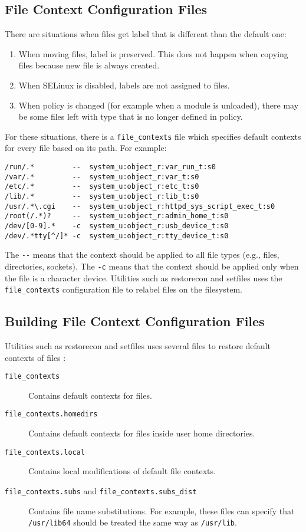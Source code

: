 \subsection{File Context Configuration Files}
There are situations when files get label that is different than the default
one:
\begin{enumerate}
    \item When moving files, label is preserved. This does not happen when
        copying files because new file is always created.
    \item When SELinux is disabled, labels are not assigned to files.
    \item When policy is changed (for example when a module is unloaded), there
        may be some files left with type that is no longer defined in policy.
\end{enumerate}
For these situations, there is a \texttt{file\_contexts} file which specifies
default contexts for every file based on its path. For example:
\begin{lstlisting}
/run/.*         --  system_u:object_r:var_run_t:s0
/var/.*	        --  system_u:object_r:var_t:s0
/etc/.*	        --  system_u:object_r:etc_t:s0
/lib/.*	        --  system_u:object_r:lib_t:s0
/usr/.*\.cgi    --  system_u:object_r:httpd_sys_script_exec_t:s0
/root(/.*)?     --  system_u:object_r:admin_home_t:s0
/dev/[0-9].*    -c  system_u:object_r:usb_device_t:s0
/dev/.*tty[^/]* -c  system_u:object_r:tty_device_t:s0
\end{lstlisting}
The \texttt{-{}-} means that the context should be applied to all file types
(e.g., files, directories, sockets). The \texttt{-c} means that the context
should be applied only when the file is a character device. Utilities such as
restorecon and setfiles uses the \texttt{file\_contexts} configuration file to
relabel files on the filesystem.

\subsection{Building File Context Configuration Files}
Utilities such as restorecon and setfiles uses several files to
restore default contexts of files \cite[pp.~165--167]{tsn}:
\begin{description}
    \item [\texttt{file\_contexts}] Contains default contexts for files.
    \item [\texttt{file\_contexts.homedirs}] Contains default contexts for files
        inside user home directories.
    \item [\texttt{file\_contexts.local}] Contains local modifications of
        default file contexts.
    \item [\texttt{file\_contexts.subs} and \texttt{file\_contexts.subs\_dist}]
        Contains file name substitutions. For example, these files can specify
        that \texttt{/usr/lib64} should be treated the same way as
        \texttt{/usr/lib}.
\end{description}

